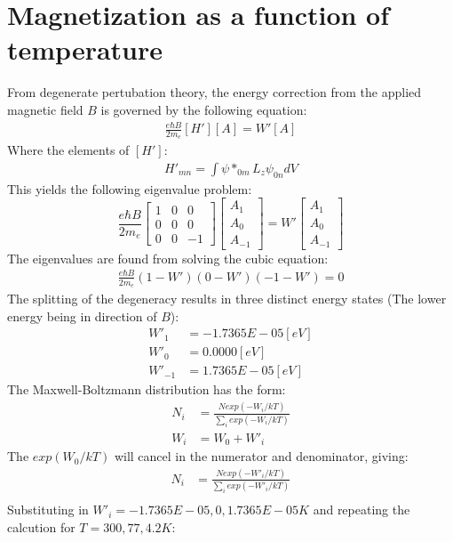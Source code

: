 \documentclass{article}
\numberwithin{equation}{section}
\begin{document}
\large
\section*{Magnetization as a function of temperature}
From degenerate pertubation theory, the energy correction from the applied magnetic field $B$ is governed by the following equation:
\begin{align*}
 \frac{e\hbar B}{2m_e}[H'][A]=W'[A]
\end{align*} 
Where the elements of $[H']$:
\begin{align*}
	H'_{mn}=\int \psi*_{0m}L_z\psi_{0n}dV
\end{align*}
This yields the following eigenvalue problem:
\[
  \frac{e\hbar B}{2m_e}
 \begin{bmatrix}
  1 & 0 & 0\\
  0 & 0  & 0\\
  0 & 0 & -1 
 \end{bmatrix}
 \begin{bmatrix}
  A_{1} \\
  A_{0} \\
  A_{-1} 
 \end{bmatrix}=W'
 \begin{bmatrix}
  A_{1} \\
  A_{0} \\
  A_{-1} 
 \end{bmatrix}
\]
The eigenvalues are found from solving the cubic equation:
\begin{align*}
	\frac{e\hbar B}{2m_e}(1-W')(0-W')(-1-W')=0
\end{align*}
The splitting of the degeneracy results in three distinct energy states (The lower energy being in direction of $B$):
\begin{align*}
         W'_{1}&=-1.7365E-05 [eV]\\
         W'_0&=  0.0000 [eV]\\
         W'_{-1}&=  1.7365E-05 [eV]
\end{align*}
The Maxwell-Boltzmann distribution has the form:
\begin{align*}
	N_i&=\frac{Nexp(-W_i/kT)}{\sum_iexp(-W_i/kT)}\\
	W_i&=W_0+W'_i 	
\end{align*}
The $exp(W_0/kT)$ will cancel in the numerator and denominator, giving:
\begin{align*}
	N_i&=\frac{Nexp(-W'_i/kT)}{\sum_iexp(-W'_i/kT)}\\
\end{align*}
Substituting in $W'_i={-1.7365E-05,0,1.7365E-05}K$ and repeating the calcution for $T={300,77,4.2}K$:
\end{document}
